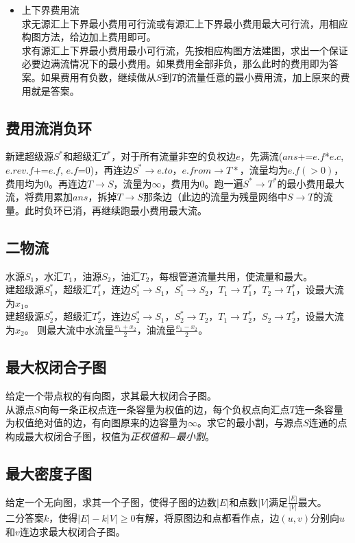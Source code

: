 \begin{itemize}[nosep,wide=0pt]
\begin{itemize}[nosep,wide=0pt]
				\end{itemize}
			\item 上下界费用流
				\\求无源汇上下界最小费用可行流或有源汇上下界最小费用最大可行流，用相应构图方法，给边加上费用即可。
				\\求有源汇上下界最小费用最小可行流，先按相应构图方法建图，求出一个保证必要边满流情况下的最小费用。如果费用全部非负，那么此时的费用即为答案。如果费用有负数，继续做从$ S $到$ T $的流量任意的最小费用流，加上原来的费用就是答案。
		\end{itemize}
	\subsection*{费用流消负环}
		新建超级源$ S^\ast $和超级汇$ T^\ast $，对于所有流量非空的负权边$ e $，先满流($ ans $+=$ e.f $*$ e.c $, $  e.rev.f $+=$ e.f $, $ e.f $=$ 0 $)，再连边$ S^\ast \to e.to $，$ e.from \to T\ast $，流量均为$ e.f (> 0) $，费用均为$ 0 $。再连边$ T \to S $，流量为$ \infty $，费用为$ 0 $。跑一遍$ S^\ast \to T^\ast $的最小费用最大流，将费用累加$ ans $，拆掉$ T \to S $那条边（此边的流量为残量网络中$ S \to T $的流量。此时负环已消，再继续跑最小费用最大流。
	\subsection*{二物流}
		水源$ S_1 $，水汇$ T_1 $，油源$ S_2 $，油汇$ T_2 $，每根管道流量共用，使流量和最大。
		\\建超级源$ S_1^\ast $，超级汇$ T_1^\ast $，连边$ S_1^\ast \to S_1 $，$ S_1^\ast \to S_2 $，$ T_1 \to T_1^\ast $，$ T_2 \to T_1^\ast $，设最大流为$ x_1 $。
		\\建超级源$ S_2^\ast $，超级汇$ T_2^\ast $，连边$ S_2^\ast \to S_1 $，$ S_2^\ast \to T_2 $，$ T_1 \to T_2^\ast $，$ S_2 \to T_2^\ast $，设最大流为$ x_2 $。
		则最大流中水流量$ \frac{x_1 + x_2}{2} $，油流量$ \frac{x_1 - x_2}{2} $。
	\subsection*{最大权闭合子图}
		给定一个带点权的有向图，求其最大权闭合子图。
		\\从源点$ S $向每一条正权点连一条容量为权值的边，每个负权点向汇点$ T $连一条容量为权值绝对值的边，有向图原来的边容量为$ \infty $。求它的最小割，与源点$ S $连通的点构成最大权闭合子图，权值为\textit{正权值和}$ - $\textit{最小割}。
	\subsection*{最大密度子图}
		给定一个无向图，求其一个子图，使得子图的边数$ \left| E \right| $和点数$ \left| V \right| $满足$ \frac{\left| E \right|}{\left| V \right|} $最大。
		\\二分答案$ k $，使得$ \left| E \right| - k \left| V \right| \geq 0 $有解，将原图边和点都看作点，边$ (u, v) $分别向$ u $和$ v $连边求最大权闭合子图。
		
